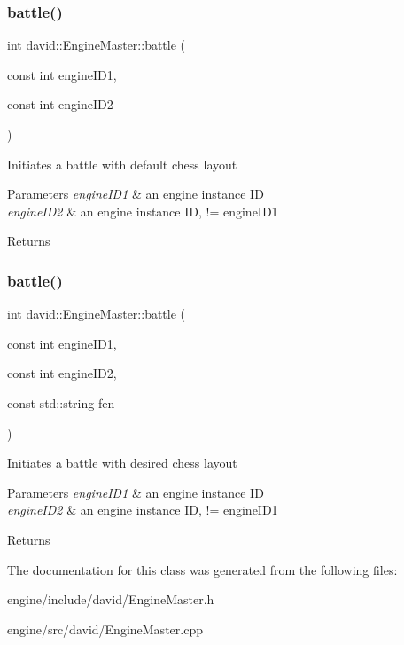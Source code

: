 \subsubsection{\texorpdfstring{battle()}{battle()}\hspace{0.1cm}{\footnotesize\ttfamily [1/2]}}
{\footnotesize\ttfamily int david\+::\+Engine\+Master\+::battle (\begin{DoxyParamCaption}\item[{const int}]{engine\+I\+D1,  }\item[{const int}]{engine\+I\+D2 }\end{DoxyParamCaption})}

Initiates a battle with default chess layout


\begin{DoxyParams}{Parameters}
{\em engine\+I\+D1} & an engine instance ID \\
\hline
{\em engine\+I\+D2} & an engine instance ID, != engine\+I\+D1 \\
\hline
\end{DoxyParams}
\begin{DoxyReturn}{Returns}

\end{DoxyReturn}
\mbox{\label{classdavid_1_1EngineMaster_a714b4dd5a0ce60b61f0c9f5ad769644d}} 
\subsubsection{\texorpdfstring{battle()}{battle()}\hspace{0.1cm}{\footnotesize\ttfamily [2/2]}}
{\footnotesize\ttfamily int david\+::\+Engine\+Master\+::battle (\begin{DoxyParamCaption}\item[{const int}]{engine\+I\+D1,  }\item[{const int}]{engine\+I\+D2,  }\item[{const std\+::string}]{fen }\end{DoxyParamCaption})}

Initiates a battle with desired chess layout


\begin{DoxyParams}{Parameters}
{\em engine\+I\+D1} & an engine instance ID \\
\hline
{\em engine\+I\+D2} & an engine instance ID, != engine\+I\+D1 \\
\hline
\end{DoxyParams}
\begin{DoxyReturn}{Returns}

\end{DoxyReturn}


The documentation for this class was generated from the following files\+:\begin{DoxyCompactItemize}
\item 
engine/include/david/Engine\+Master.\+h\item 
engine/src/david/Engine\+Master.\+cpp\end{DoxyCompactItemize}
